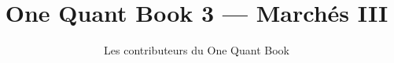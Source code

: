 \documentclass[11pt,a4paper,twoside,openany]{book}
\title{One Quant Book 3 --- Marchés III}
\author{Les contributeurs du One Quant Book}
\date{\bookdate}
\begin{document}
\frontmatter



\tableofcontents

\mainmatter


\appendix
\part{\omsolutionspart}


\backmatter
\printindex
\end{document}

